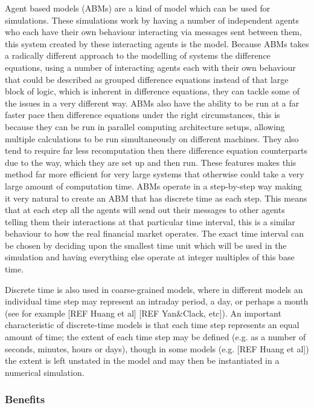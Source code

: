 \documentclass{article}
\begin{document}
Agent based models (ABMs) are a kind of model which can be used for simulations. These simulations work by having a number of independent agents who each have their own behaviour interacting via messages sent between them, this system created by these interacting agents is the model. 
Because ABMs takes a radically different approach to the modelling of systems the difference equations, using a number of interacting agents each with their own behaviour that could be described as grouped difference equations instead of that large block of logic, which is inherent in difference equations, they can tackle some of the issues in a very different way. 
ABMs also have the ability to be run at a far faster pace then difference equations under the right circumstances, this is because they can be run in parallel computing architecture setups, allowing multiple calculations to be run simultaneously on different machines. 
They also tend to require far less recomputation then there difference equation counterparts due to the way, which they are set up and then run.
These features makes this method far more efficient for very large systems that otherwise could take a very large amount of computation time.  
ABMs operate in a step-by-step way making it very natural to create an ABM that has discrete time as each step. This means that at each step all the agents will send out their messages to other agents telling them their interactions at that particular time interval, this is a similar behaviour to how the real financial market operates. The exact time interval can be chosen by deciding upon the smallest time unit which will be used in the simulation and having everything else operate at integer multiples of this base time.


Discrete time is also used in coarse-grained models, where in different models an individual time step may represent an intraday period, a day, or perhaps a month (see for example [REF Huang et al] [REF Yan&Clack, etc]).  An important characteristic of discrete-time models is that each time step represents an equal amount of time; the extent of each time step may be defined (e.g. as a number of seconds, minutes, hours or days), though in some models (e.g. [REF Huang et al]) the extent is left unstated in the model and may then be instantiated in a numerical simulation. 


\subsubsection{Benefits} 
\end{document}
